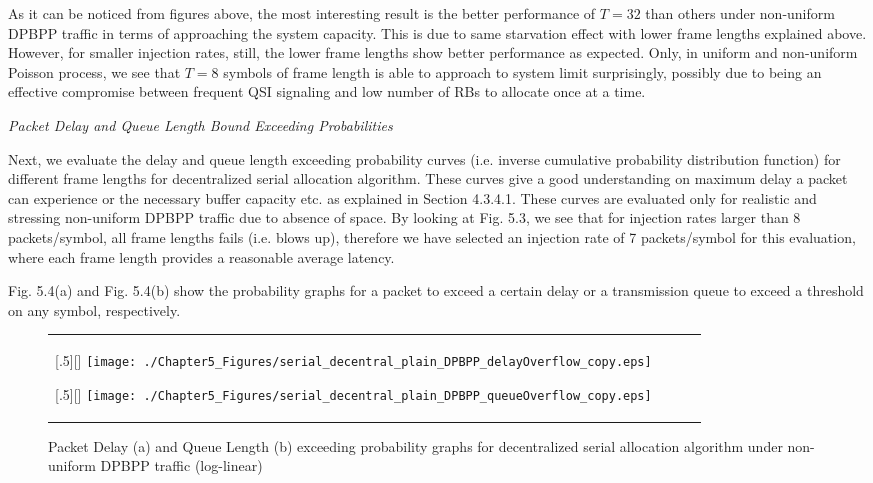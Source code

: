 As it can be noticed from figures above, the most interesting result is the better performance of $T=32$ than others under non-uniform DPBPP traffic in terms of approaching the system capacity. This is due to same starvation effect with lower frame lengths explained above. However, for smaller injection rates, still, the lower frame lengths show better performance as expected. Only, in uniform and non-uniform Poisson process, we see that $T=8$ symbols of frame length is able to approach to system limit surprisingly, possibly due to being an effective compromise between frequent QSI signaling and low number of RBs to allocate once at a time. 

\pagebreak

\textit{Packet Delay and Queue Length Bound Exceeding Probabilities}

Next, we evaluate the delay and queue length exceeding probability curves (i.e. inverse cumulative probability distribution function) for different frame lengths for decentralized serial allocation algorithm. These curves give a good understanding on maximum delay a packet can experience or the necessary buffer capacity etc. as explained in Section 4.3.4.1. These curves are evaluated only for realistic and stressing non-uniform DPBPP traffic due to absence of space. By looking at Fig. 5.3, we see that for injection rates larger than 8 packets/symbol, all frame lengths fails (i.e. blows up), therefore we have selected an injection rate of 7 packets/symbol for this evaluation, where each frame length provides a reasonable average latency.

Fig. 5.4(a) and Fig. 5.4(b) show the probability graphs for a packet to exceed a certain delay or a transmission queue to exceed a threshold on any symbol, respectively. 



\begin{figure*}[htbp]
  \centering
  \begin{tabular}[c]{cccc}

  \subcaptionbox{}[.5\linewidth][]{%
    \texttt{[image: ./Chapter5\_Figures/serial\_decentral\_plain\_DPBPP\_delayOverflow\_copy.eps]} }	
    
  \subcaptionbox{}[.5\linewidth][]{%
    \texttt{[image: ./Chapter5\_Figures/serial\_decentral\_plain\_DPBPP\_queueOverflow\_copy.eps]}}
 
   \end{tabular}

  \caption{Packet Delay (a) and Queue Length (b) exceeding probability graphs for decentralized serial allocation algorithm under non-uniform DPBPP traffic (log-linear)}
\end{figure*}


